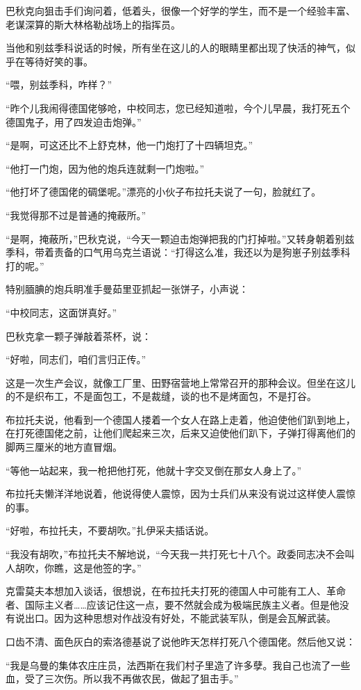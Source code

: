 巴秋克向狙击手们询问着，低着头，很像一个好学的学生，而不是一个经验丰富、老谋深算的斯大林格勒战场上的指挥员。

当他和别兹季科说话的时候，所有坐在这儿的人的眼睛里都出现了快活的神气，似乎在等待好笑的事。

“喂，别兹季科，咋样？”

“昨个儿我闹得德国佬够呛，中校同志，您已经知道啦，今个儿早晨，我打死五个德国鬼子，用了四发迫击炮弹。”

“是啊，可这还比不上舒克林，他一门炮打了十四辆坦克。”

“他打一门炮，因为他的炮兵连就剩一门炮啦。”

“他打坏了德国佬的碉堡呢。”漂亮的小伙子布拉托夫说了一句，脸就红了。

“我觉得那不过是普通的掩蔽所。”

“是啊，掩蔽所，”巴秋克说，“今天一颗迫击炮弹把我的门打掉啦。”又转身朝着别兹季科，带着责备的口气用乌克兰语说：“打得这么准，我还以为是狗崽子别兹季科打的呢。”

特别腼腆的炮兵眀准手曼茹里亚抓起一张饼子，小声说：

“中校同志，这面饼真好。”

巴秋克拿一颗子弹敲着茶杯，说：

“好啦，同志们，咱们言归正传。”

这是一次生产会议，就像工厂里、田野宿营地上常常召开的那种会议。但坐在这儿的不是织布工，不是面包工，不是裁缝，谈的也不是烤面包，不是打谷。

布拉托夫说，他看到一个德国人搂着一个女人在路上走着，他迫使他们趴到地上，在打死德国佬之前，让他们爬起来三次，后来又迫使他们趴下，子弹打得离他们的脚两三厘米的地方直冒烟。

“等他一站起来，我一枪把他打死，他就十字交叉倒在那女人身上了。”

布拉托夫懒洋洋地说着，他说得使人震惊，因为士兵们从来没有说过这样使人震惊的事。

“好啦，布拉托夫，不要胡吹。”扎伊采夫插话说。

“我没有胡吹，”布拉托夫不解地说，“今天我一共打死七十八个。政委同志决不会叫人胡吹，你瞧，这是他签的字。”

克雷莫夫本想加入谈话，很想说，在布拉托夫打死的德国人中可能有工人、革命者、国际主义者……应该记住这一点，要不然就会成为极端民族主义者。但是他没有说出口。因为这种思想对作战没有好处，不能武装军队，倒是会瓦解武装。

口齿不清、面色灰白的索洛德基说了说他昨天怎样打死八个德国佬。然后他又说：

“我是乌曼的集体农庄庄员，法西斯在我们村子里造了许多孽。我自己也流了一些血，受了三次伤。所以我不再做农民，做起了狙击手。”

